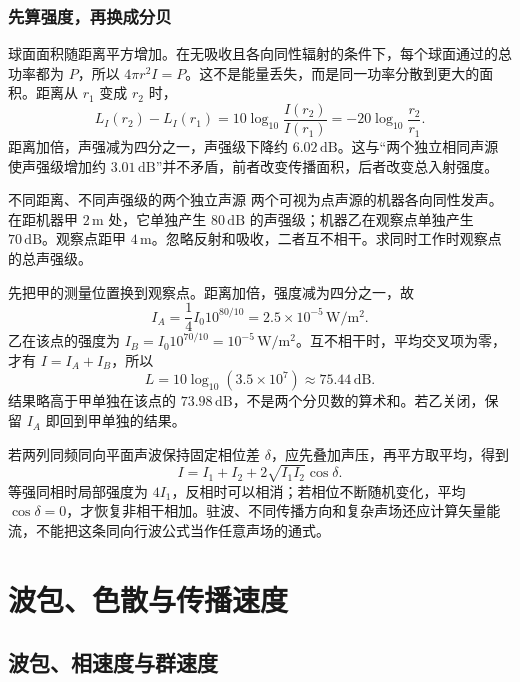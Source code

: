 \subsubsection{先算强度，再换成分贝}
球面面积随距离平方增加。在无吸收且各向同性辐射的条件下，每个球面通过的总功率都为 $P$，所以 $4\pi r^2I=P$。这不是能量丢失，而是同一功率分散到更大的面积。距离从 $r_1$ 变成 $r_2$ 时，
\[
 L_I(r_2)-L_I(r_1)
 =10\log_{10}\frac{I(r_2)}{I(r_1)}
 =-20\log_{10}\frac{r_2}{r_1}.
\]
距离加倍，声强减为四分之一，声强级下降约 $6.02\,\mathrm{dB}$。这与“两个独立相同声源使声强级增加约 $3.01\,\mathrm{dB}$”并不矛盾，前者改变传播面积，后者改变总入射强度。

\begin{origexamplebox}{不同距离、不同声强级的两个独立声源}\label{ch12:ex:teaching-sound-distance}
两个可视为点声源的机器各向同性发声。在距机器甲 $2\,\mathrm m$ 处，它单独产生 $80\,\mathrm{dB}$ 的声强级；机器乙在观察点单独产生 $70\,\mathrm{dB}$。观察点距甲 $4\,\mathrm m$。忽略反射和吸收，二者互不相干。求同时工作时观察点的总声强级。

\ThQSoundDistance
\end{origexamplebox}
\begin{xesolution}
\ThASoundDistance

先把甲的测量位置换到观察点。距离加倍，强度减为四分之一，故
\[
 I_A=\frac14I_0 10^{80/10}=2.5\times10^{-5}\,\mathrm{W/m^2}.
\]
乙在该点的强度为 $I_B=I_0 10^{70/10}=10^{-5}\,\mathrm{W/m^2}$。互不相干时，平均交叉项为零，才有 $I=I_A+I_B$，所以
\[
 L=10\log_{10}(3.5\times10^7)\approx75.44\,\mathrm{dB}.
\]
结果略高于甲单独在该点的 $73.98\,\mathrm{dB}$，不是两个分贝数的算术和。若乙关闭，保留 $I_A$ 即回到甲单独的结果。
\end{xesolution}

若两列同频同向平面声波保持固定相位差 $\delta$，应先叠加声压，再平方取平均，得到
\[
 I=I_1+I_2+2\sqrt{I_1I_2}\cos\delta.
\]
等强同相时局部强度为 $4I_1$，反相时可以相消；若相位不断随机变化，平均 $\cos\delta=0$，才恢复非相干相加。驻波、不同传播方向和复杂声场还应计算矢量能流，不能把这条同向行波公式当作任意声场的通式。

\section{波包、色散与传播速度}
\subsection{波包、相速度与群速度}

